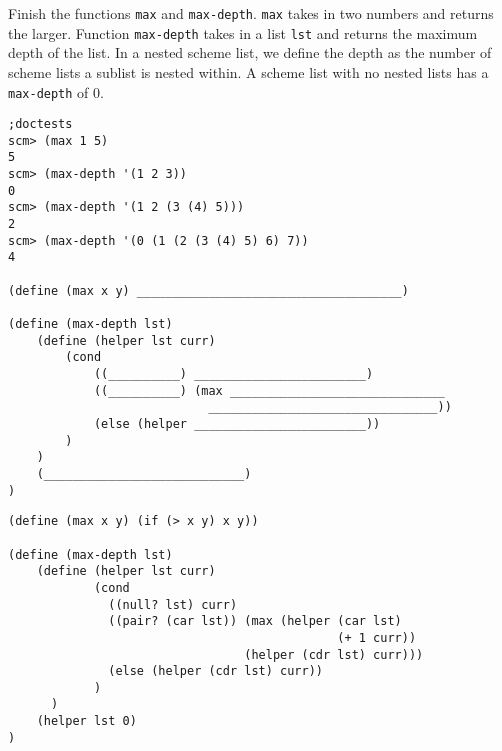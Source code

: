 \begin{blocksection}
\question Finish the functions \lstinline{max} and \lstinline{max-depth}. \lstinline{max} takes in two numbers and returns the larger. Function \lstinline{max-depth} takes in a list \lstinline{lst} and returns the maximum depth of the list. In a nested scheme list, we define the depth as the number of scheme lists a sublist is nested within. A scheme list with no nested lists has a \lstinline{max-depth} of 0. 

\begin{lstlisting}
;doctests
scm> (max 1 5)
5
scm> (max-depth '(1 2 3))
0
scm> (max-depth '(1 2 (3 (4) 5)))
2
scm> (max-depth '(0 (1 (2 (3 (4) 5) 6) 7))
4

(define (max x y) _____________________________________)

(define (max-depth lst)
    (define (helper lst curr)
        (cond 
            ((__________) ________________________)
            ((__________) (max ______________________________
                            ________________________________))
            (else (helper ________________________))
        )
    )
    (____________________________)
)
\end{lstlisting}
\end{blocksection}

\begin{blocksection}
\begin{solution}
\begin{lstlisting}
(define (max x y) (if (> x y) x y))

(define (max-depth lst)
    (define (helper lst curr)
            (cond 
              ((null? lst) curr)
              ((pair? (car lst)) (max (helper (car lst) 
                                              (+ 1 curr)) 
                                 (helper (cdr lst) curr)))
              (else (helper (cdr lst) curr))
            )
      )
    (helper lst 0)
)

\end{lstlisting}
\end{solution}
\end{blocksection}

